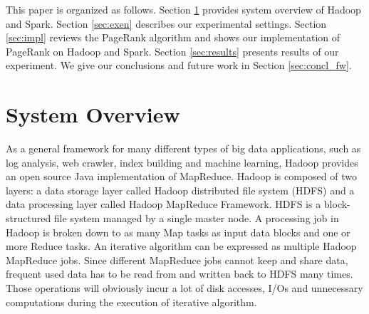 \documentclass[12pt,conference,letterpaper]{IEEEtran}
\begin{document}

This paper is organized as follows. Section \ref{sec:sys_ov} provides system overview of Hadoop and Spark. Section \ref{sec:exen} describes our experimental settings. Section \ref{sec:impl} reviews the PageRank algorithm and shows our implementation of PageRank on Hadoop and Spark. Section \ref{sec:results} presents results of our experiment. We give our conclusions and future work in Section \ref{sec:concl_fw}.



\section{System Overview}
\label{sec:sys_ov}

As a general framework for many different types of big data applications, such as log analysis, web crawler, index building and machine learning, Hadoop\cite{url_hadoop} provides an open source Java implementation of MapReduce. Hadoop is composed of two layers: a data storage layer called Hadoop distributed file system (HDFS) and a data processing layer called Hadoop MapReduce Framework. HDFS is a block-structured file system managed by a single master node.  A processing job in Hadoop is broken down to as many Map tasks as input data blocks and one or more Reduce tasks. An iterative algorithm can be expressed as multiple Hadoop MapReduce jobs. Since different MapReduce jobs cannot keep and share data, frequent used data has to be read from and written back to HDFS many times. Those operations will obviously incur a lot of disk accesses, I/Os and unnecessary computations \cite{jaliya2010} \cite{yingyi2010} \cite{yanfeng2011} during the execution of iterative algorithm.
\end{document}

